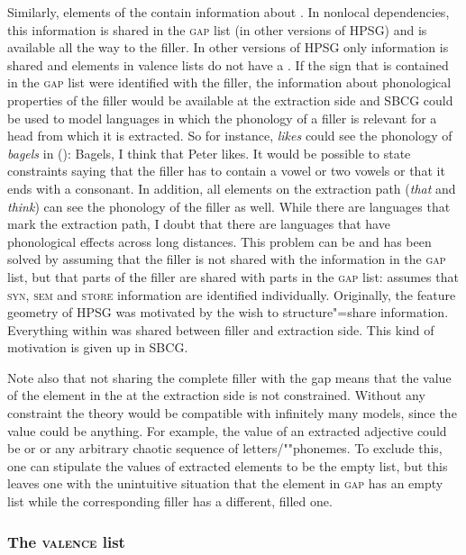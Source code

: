 Similarly, elements of the \argstl contain information about \form. In nonlocal dependencies, this information is shared in the \textsc{gap} list (\slashl in other versions of
HPSG) and is available all the way to the filler. In other versions of HPSG only \local information is shared and elements in valence lists
do not have a \phonf. If the sign that is contained in the \textsc{gap} list were identified with
the filler, the information about phonological properties of the filler would be available at the
extraction side and SBCG could be used to model languages in which the phonology of
a filler is relevant for a head from which it is extracted. So for instance, \emph{likes} could see the
phonology of \emph{bagels} in ():
\ea
Bagels, I think that Peter likes.
\z
It would be possible to state constraints saying that the filler has to contain a vowel or two
vowels or that it ends with a consonant. In addition, all elements on the extraction path
(\emph{that} and \emph{think}) can see the phonology of the filler as well. While there are
languages that mark the extraction path, I doubt that there are languages that have phonological
effects across long distances. This problem can be and has been solved by assuming that the
filler is not shared with the information in the \textsc{gap} list, but that parts of the filler are
shared with parts in the \textsc{gap} list: \citet[]{Sag2012a} assumes that \textsc{syn},
\textsc{sem} and \textsc{store} information are identified individually. Originally, the feature
geometry of HPSG was motivated by the wish to structure"=share information. Everything within \local
was shared between filler and extraction side. This kind of motivation is given up in SBCG.

Note also that not sharing the complete filler with the gap means that the \form
value of the element in the \argstl at the extraction side is not constrained. Without any
constraint the theory would be compatible with infinitely many models, since the \form value could be
anything. For example, the \form value of an extracted adjective could be 
or  or any arbitrary chaotic sequence of letters/""phonemes. To exclude
this, one can stipulate the \form values of extracted elements to be the empty list, but this leaves
one with the unintuitive situation that the element in \textsc{gap} has an empty \form list while
the corresponding filler has a different, filled one. 

\subsubsection{The \textsc{valence} list}
\label{sec-valence-feature-sbcg}

